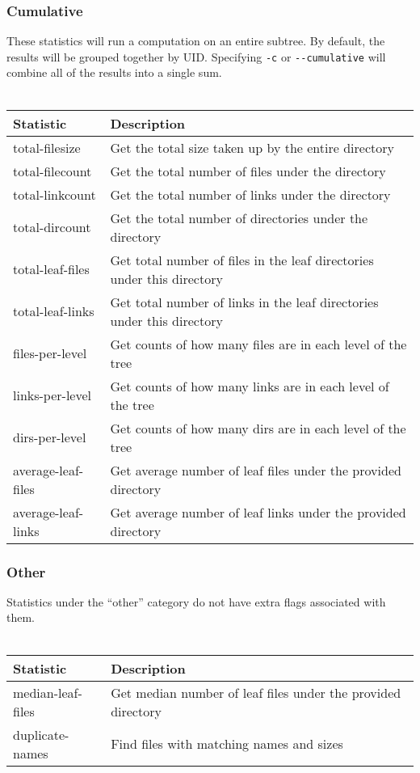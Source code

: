 \subsubsection{Cumulative}
These statistics will run a computation on an entire subtree. By
default, the results will be grouped together by UID. Specifying
\texttt{-c} or \texttt{-{}-cumulative} will combine all of the results
into a single sum.
\\\\
\begin{table}[h!]
  \begin{tabular} {| l | l |}
    \hline
    Statistic & Description \\
    \hline
    total-filesize & Get the total size taken up by the entire directory
    \\
    \hline
    total-filecount & Get the total number of files under the directory \\
    \hline
    total-linkcount & Get the total number of links under the directory \\
    \hline
    total-dircount & Get the total number of directories under the
    directory \\
    \hline
    total-leaf-files & Get total number of files in the leaf directories
    under this directory \\
    \hline
    total-leaf-links & Get total number of links in the leaf directories
    under this directory \\
    \hline
    files-per-level & Get counts of how many files are in each level of
    the tree \\
    \hline
    links-per-level & Get counts of how many links are in each level of
    the tree \\
    \hline
    dirs-per-level & Get counts of how many dirs are in each level of the
    tree \\
    \hline
    average-leaf-files & Get average number of leaf files under the
    provided directory \\
    \hline
    average-leaf-links & Get average number of leaf links under the
    provided directory \\
    \hline
  \end{tabular}
\end{table}

\subsubsection{Other}
Statistics under the ``other'' category do not have extra flags
associated with them.
\\\\
\begin{table}[h!]
  \begin{tabular} {| l | l |}
    \hline
    Statistic & Description \\
    \hline
    median-leaf-files & Get median number of leaf files under the provided
    directory \\
    \hline
    duplicate-names & Find files with matching names and sizes \\
    \hline
  \end{tabular}
\end{table}
